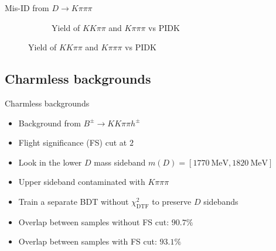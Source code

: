 \documentclass{beamer}
\begin{document}
\begin{frame}{Mis-ID from $D\to K\pi\pi\pi$}
\begin{figure}
\begin{subfigure}{0.5\textwidth}
      \caption{Yield of $KK\pi\pi$ and $K\pi\pi\pi$ vs $\text{PIDK}$}
    \end{subfigure}
  \end{figure}
\end{frame}

\subsection{Charmless backgrounds}
\begin{frame}{Charmless backgrounds}
  \begin{itemize}
    \setlength\itemsep{1.5em}
    \item{Background from $B^\pm\to KK\pi\pi h^\pm$}
    \item{Flight significance (FS) cut at $2$}
    \item{Look in the lower $D$ mass sideband $m(D) = [\SI{1770}{\mega\eV}, \SI{1820}{\mega\eV}]$}
    \item{Upper sideband contaminated with $K\pi\pi\pi$}
    \item{Train a separate BDT without $\chi^2_{\text{DTF}}$ to preserve $D$ sidebands}
    \item{Overlap between samples without FS cut: $90.7\%$}
    \item{Overlap between samples with FS cut: $93.1\%$}
  \end{itemize}
\end{frame}
\end{document}
